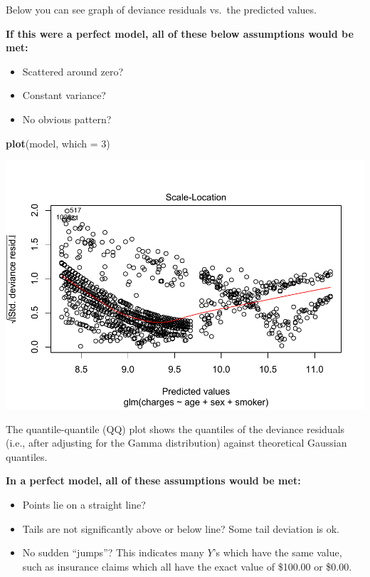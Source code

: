 \documentclass[openany]{book}
\newenvironment{Shaded}{\begin{snugshade}}{\end{snugshade}}
\newcommand{\DataTypeTok}[1]{\textcolor[rgb]{0.13,0.29,0.53}{#1}}
\newcommand{\DecValTok}[1]{\textcolor[rgb]{0.00,0.00,0.81}{#1}}
\newcommand{\KeywordTok}[1]{\textcolor[rgb]{0.13,0.29,0.53}{\textbf{#1}}}
\newcommand{\NormalTok}[1]{#1}
\providecommand{\tightlist}{%
  \setlength{\itemsep}{0pt}\setlength{\parskip}{0pt}}
\begin{document}
Below you can see graph of deviance residuals vs.~the predicted values.

\textbf{If this were a perfect model, all of these below assumptions would be met:}

\begin{itemize}
\tightlist
\item
  Scattered around zero?
\item
  Constant variance?
\item
  No obvious pattern?
\end{itemize}

\begin{Shaded}
\begin{Highlighting}[]
\KeywordTok{plot}\NormalTok{(model, }\DataTypeTok{which =} \DecValTok{3}\NormalTok{)}
\end{Highlighting}
\end{Shaded}

\includegraphics{05-linear-models_files/figure-latex/unnamed-chunk-17-1.pdf}

The quantile-quantile (QQ) plot shows the quantiles of the deviance residuals (i.e., after adjusting for the Gamma distribution) against theoretical Gaussian quantiles.

\textbf{In a perfect model, all of these assumptions would be met:}

\begin{itemize}
\tightlist
\item
  Points lie on a straight line?\\
\item
  Tails are not significantly above or below line? Some tail deviation is ok.
\item
  No sudden ``jumps''? This indicates many \(Y\)'s which have the same value, such as insurance claims which all have the exact value of \$100.00 or \$0.00.
\end{itemize}
\end{document}
